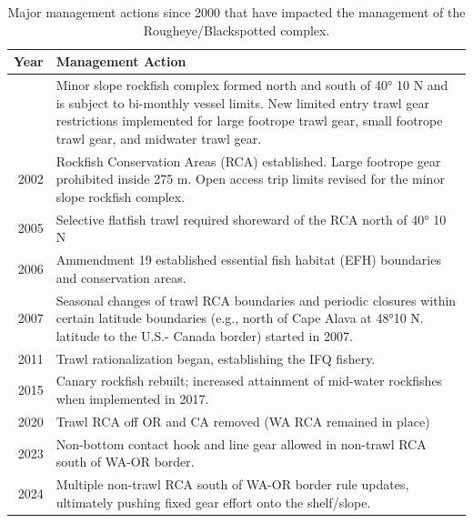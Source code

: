 \documentclass[
  english,
]{article}
\begin{document}
\begin{longtable}{r>{\raggedright\arraybackslash}p{\dimexpr 300.00pt -2\tabcolsep-1.5\arrayrulewidth}}

\caption{\label{tbl-management_summary}Major management actions since
2000 that have impacted the management of the Rougheye/Blackspotted
complex.}

\tabularnewline

\toprule
Year & Management Action \\ 
\midrule\addlinespace[2.5pt]
2000 & Minor slope rockfish complex formed north and south of 40° 10 N and is subject to bi-monthly vessel limits. New limited entry trawl gear restrictions implemented for large footrope trawl gear, small footrope trawl gear, and midwater trawl gear. \\ 
2002 & Rockfish Conservation Areas (RCA) established. Large footrope gear prohibited inside 275 m. Open access trip limits revised for the minor slope rockfish complex. \\ 
2005 & Selective flatfish trawl required shoreward of the RCA north of 40° 10 N \\ 
2006 & Ammendment 19 established essential fish habitat (EFH) boundaries and conservation areas. \\ 
2007 & Seasonal changes of trawl RCA boundaries and periodic closures within certain latitude boundaries (e.g., north of Cape Alava at 48°10 N. latitude to the U.S.- Canada border) started in 2007. \\ 
2011 & Trawl rationalization began, establishing the IFQ fishery. \\ 
2015 & Canary rockfish rebuilt; increased attainment of mid-water rockfishes when implemented in 2017.  \\ 
2020 & Trawl RCA off OR and CA removed (WA RCA remained in place) \\ 
2023 & Non-bottom contact hook and line gear allowed in non-trawl RCA south of WA-OR border. \\ 
2024 & Multiple non-trawl RCA south of WA-OR border rule updates, ultimately pushing fixed gear effort onto the shelf/slope.  \\ 
\bottomrule

\end{longtable}

\endgroup

\pagebreak
\end{document}
